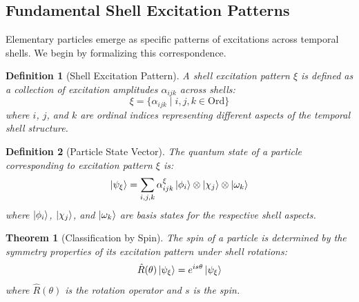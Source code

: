 \documentclass[12pt,a4paper]{article}
\newtheorem{theorem}{Theorem}[section]
\newtheorem{definition}{Definition}[section]
\begin{document}
\subsection{Fundamental Shell Excitation Patterns}
\label{subsec:excitation-patterns}

Elementary particles emerge as specific patterns of excitations across temporal shells. We begin by formalizing this correspondence.

\begin{definition}[Shell Excitation Pattern]
\label{def:excitation-pattern}
A shell excitation pattern $\xi$ is defined as a collection of excitation amplitudes $\alpha_{ijk}$ across shells:
\begin{equation}
\xi = \{\alpha_{ijk} \mid i,j,k \in \text{Ord}\}
\end{equation}
where $i$, $j$, and $k$ are ordinal indices representing different aspects of the temporal shell structure.
\end{definition}

\begin{definition}[Particle State Vector]
\label{def:particle-state}
The quantum state of a particle corresponding to excitation pattern $\xi$ is:
\begin{equation}
\ket{\psi_{\xi}} = \sum_{i,j,k} \alpha_{ijk}^{\xi} \ket{\phi_i} \otimes \ket{\chi_j} \otimes \ket{\omega_k}
\end{equation}
where $\ket{\phi_i}$, $\ket{\chi_j}$, and $\ket{\omega_k}$ are basis states for the respective shell aspects.
\end{definition}

\begin{theorem}[Classification by Spin]
\label{thm:spin-classification}
The spin of a particle is determined by the symmetry properties of its excitation pattern under shell rotations:
\begin{equation}
\hat{R}(\theta) \ket{\psi_{\xi}} = e^{is\theta} \ket{\psi_{\xi}}
\end{equation}
where $\hat{R}(\theta)$ is the rotation operator and $s$ is the spin.
\end{theorem}
\end{document}
